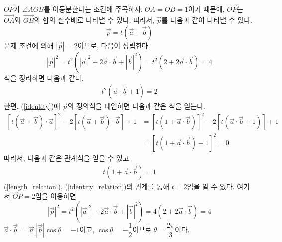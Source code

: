 \documentclass{scrartcl}
\newcommand{\Seg}[1]{\overline{#1}}
\newcommand{\Ray}[1]{\overrightarrow{#1}}
\begin{document}
\(\Seg{OP}\)가 \(\angle AOB\)를 이등분한다는 조건에 주목하자. \(\Seg{OA}=\Seg{OB}=1\)이기 때문에, \(\Ray{OP}\)는 \(\Ray{OA}\)와 \(\Ray{OB}\)의 합의 실수배로 나타낼 수 있다. 따라서, \(\vec{p}\)를 다음과 같이 나타낼 수 있다.
\[\vec{p}=t(\vec{a}+\vec{b})\]
문제 조건에 의해 \(|\vec{p}|=2\)이므로, 다음이 성립한다.
\[|\vec{p}|^2=t^2(|\vec{a}|^2+2\vec{a}\cdot\vec{b}+|\vec{b}|^2)=t^2(2+2\vec{a}\cdot\vec{b})=4\]
식을 정리하면 다음과 같다.
\begin{align}\label{length_relation}t^2(\vec{a}\cdot\vec{b}+1)=2\end{align}
한편, (\ref{identity})에 \(\vec{p}\)의 정의식을 대입하면 다음과 같은 식을 얻는다.
\begin{align*}
\left[t(\vec{a}+\vec{b})\cdot\vec{a}\right]^2-2\left[t(\vec{a}+\vec{b})\cdot\vec{b}\right]+1&=\left[t(1+\vec{a}\cdot\vec{b})\right]^2-2\left[t(\vec{a}\cdot\vec{b}+1)\right]+1 \\
&=\left[t(1+\vec{a}\cdot\vec{b})-1\right]^2=0
\end{align*}
따라서, 다음과 같은 관계식을 얻을 수 있고
\begin{align}\label{identity_relation}t(1+\vec{a}\cdot\vec{b})=1\end{align}
(\ref{length_relation}), (\ref{identity_relation})의 관계를 통해 \(t=2\)임을 알 수 있다.
여기서 \(\Seg{OP}=2\)임을 이용하면
\[|\vec{p}|^2=t^2(|\vec{a}|^2+2\vec{a}\cdot\vec{b}+|\vec{b}|^2)=4(2+2\vec{a}\cdot\vec{b})=4\]
\(\vec{a}\cdot\vec{b}=|\vec{a}||\vec{b}|\cos\theta=-1\)이고, \(\cos\theta=-\dfrac{1}{2}\)이므로 \(\theta=\dfrac{2\pi}{3}\)이다.
\end{document}
